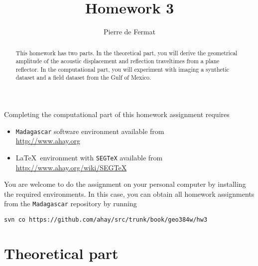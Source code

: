 \author{Pierre de Fermat} 
\title{Homework 3}

\begin{abstract}
  This homework has two parts. In the theoretical part, you will
derive the geometrical amplitude of the acoustic displacement and
reflection traveltimes from a plane reflector. In the
computational part, you will experiment with imaging a synthetic
dataset and a field dataset from the Gulf of Mexico.
\end{abstract}

Completing the computational part of this homework assignment requires
\begin{itemize}
\item \texttt{Madagascar} software environment available from \\
  \url{http://www.ahay.org}
\item \LaTeX\ environment with \texttt{SEGTeX} available from \\ 
  \url{http://www.ahay.org/wiki/SEGTeX}
\end{itemize}

You are welcome to do the assignment on your personal computer by
installing the required environments. In this case, you can obtain all
homework assignments from the \texttt{Madagascar} repository by running
\begin{verbatim}
svn co https://github.com/ahay/src/trunk/book/geo384w/hw3
\end{verbatim}

\section{Theoretical part}


